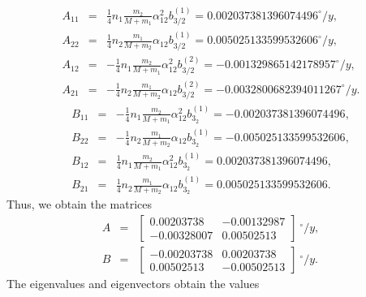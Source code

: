 \documentclass [12pt, a4paper] {article}
\begin{document}
\begin {eqnarray}
    A_{11} &=& \frac{1}{4}n_1\frac{m_2}{M + m_1} \alpha_{12}^2b_{3/2}^{(1)}
    = 0.002037381396074496^\circ/y,
    \\
    A_{22} &=& \frac{1}{4}n_2\frac{m_1}{M + m_2} \alpha_{12}b_{3/2}^{(1)}
    = 0.005025133599532606^\circ/y,
    \\
    A_{12} &=& -\frac{1}{4}n_1\frac{m_2}{M + m_1}\alpha_{12}^2b_{3/2}^{(2)}
    = -0.001329865142178957^\circ/y,
    \\
    A_{21} &=& -\frac{1}{4}n_2\frac{m_1}{M + m_2}\alpha_{12}b_{3/2}^{(2)}
    = -0.0032800682394011267^\circ/y.
\end {eqnarray}
\begin {eqnarray}
    B_{11} &=& -\frac{1}{4}n_1\frac{m_2}{M + m_1}\alpha_{12}^2b_{3_2}^{(1)}
    = -0.002037381396074496, 
    \\
    B_{22} &=& -\frac{1}{4}n_2\frac{m_1}{M + m_2}\alpha_{12}b_{3_2}^{(1)}
    = -0.005025133599532606,
    \\
    B_{12} &=& \frac{1}{4}n_1\frac{m_2}{M + m_1}\alpha_{12}^2b_{3_2}^{(1)}
    = 0.002037381396074496,
    \\
    B_{21} &=& \frac{1}{4}n_2\frac{m_1}{M + m_2}\alpha_{12}b_{3_2}^{(1)}
    = 0.005025133599532606.
\end {eqnarray}
Thus, we obtain the matrices 
\begin {eqnarray}
    A 
    &=& 
    \begin {bmatrix}
        0.00203738 & -0.00132987 \\
        -0.00328007 & 0.00502513
    \end {bmatrix}
    {\:}^\circ/y,
    \\
    B
    &=& 
    \begin {bmatrix}
        -0.00203738 & 0.00203738 \\
         0.00502513 & -0.00502513
    \end {bmatrix}
    {\:}^\circ/y.
\end {eqnarray}
The eigenvalues and eigenvectors obtain the values
\end{document}

